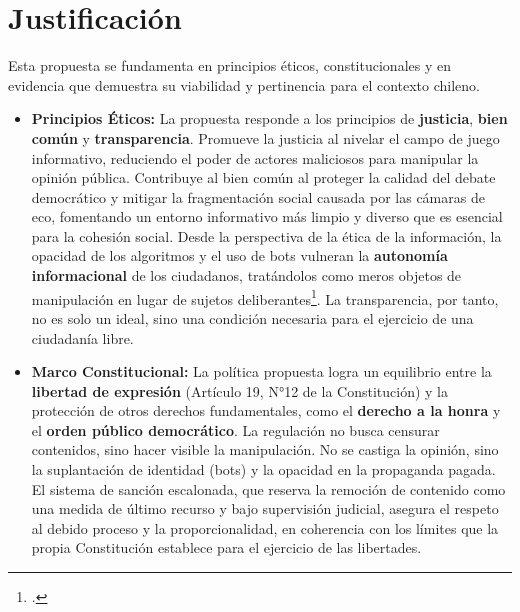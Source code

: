 \documentclass[12pt, letterpaper]{article}
\begin{document}
\newpage

\section*{Justificación}
\thispagestyle{fancy}

Esta propuesta se fundamenta en principios éticos, constitucionales y en evidencia que demuestra su viabilidad y pertinencia para el contexto chileno.
\begin{itemize}[leftmargin=*, itemsep=0.5em]
	\item \textbf{Principios Éticos:} La propuesta responde a los principios de \textbf{justicia}, \textbf{bien común} y \textbf{transparencia}. Promueve la justicia al nivelar el campo de juego informativo, reduciendo el poder de actores maliciosos para manipular la opinión pública. Contribuye al bien común al proteger la calidad del debate democrático y mitigar la fragmentación social causada por las cámaras de eco, fomentando un entorno informativo más limpio y diverso que es esencial para la cohesión social. Desde la perspectiva de la ética de la información, la opacidad de los algoritmos y el uso de bots vulneran la \textbf{autonomía informacional} de los ciudadanos, tratándolos como meros objetos de manipulación en lugar de sujetos deliberantes\footcite{floridi_2022}. La transparencia, por tanto, no es solo un ideal, sino una condición necesaria para el ejercicio de una ciudadanía libre.

	\item \textbf{Marco Constitucional:} La política propuesta logra un equilibrio entre la \textbf{libertad de expresión} (Artículo 19, N°12 de la Constitución) y la protección de otros derechos fundamentales, como el \textbf{derecho a la honra} y el \textbf{orden público democrático}. La regulación no busca censurar contenidos, sino hacer visible la manipulación. No se castiga la opinión, sino la suplantación de identidad (bots) y la opacidad en la propaganda pagada. El sistema de sanción escalonada, que reserva la remoción de contenido como una medida de último recurso y bajo supervisión judicial, asegura el respeto al debido proceso y la proporcionalidad, en coherencia con los límites que la propia Constitución establece para el ejercicio de las libertades.


\end{itemize}
\end{document}
